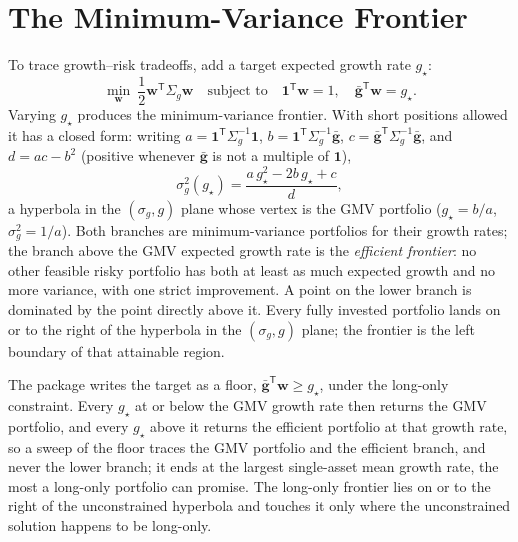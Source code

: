 \documentclass[11pt]{article}
\begin{document}
\section{The Minimum-Variance Frontier}

To trace growth--risk tradeoffs, add a target expected growth rate $g_\star$:
\begin{equation}
  \label{eq:frontier-problem}
  \min_{\mathbf w}\ \frac12\mathbf w^{\mathsf T}\Sigma_g\mathbf w
  \quad\text{subject to}\quad
  \mathbf1^{\mathsf T}\mathbf w=1,
  \quad
  \bar{\mathbf g}^{\mathsf T}\mathbf w=g_\star.
\end{equation}
Varying $g_\star$ produces the minimum-variance frontier. With short positions allowed it has a closed form: writing $a=\mathbf1^{\mathsf T}\Sigma_g^{-1}\mathbf1$, $b=\mathbf1^{\mathsf T}\Sigma_g^{-1}\bar{\mathbf g}$, $c=\bar{\mathbf g}^{\mathsf T}\Sigma_g^{-1}\bar{\mathbf g}$, and $d=ac-b^2$ (positive whenever $\bar{\mathbf g}$ is not a multiple of $\mathbf1$),
\begin{equation}
  \label{eq:frontier-hyperbola}
  \sigma_g^2(g_\star)=\frac{a\,g_\star^2-2b\,g_\star+c}{d},
\end{equation}
a hyperbola in the $(\sigma_g,g)$ plane whose vertex is the GMV portfolio ($g_\star=b/a$, $\sigma_g^2=1/a$). Both branches are minimum-variance portfolios for their growth rates; the branch above the GMV expected growth rate is the \emph{efficient frontier}: no other feasible risky portfolio has both at least as much expected growth and no more variance, with one strict improvement. A point on the lower branch is dominated by the point directly above it. Every fully invested portfolio lands on or to the right of the hyperbola in the $(\sigma_g,g)$ plane; the frontier is the left boundary of that attainable region.

The package writes the target as a floor, $\bar{\mathbf g}^{\mathsf T}\mathbf w\geq g_\star$, under the long-only constraint. Every $g_\star$ at or below the GMV growth rate then returns the GMV portfolio, and every $g_\star$ above it returns the efficient portfolio at that growth rate, so a sweep of the floor traces the GMV portfolio and the efficient branch, and never the lower branch; it ends at the largest single-asset mean growth rate, the most a long-only portfolio can promise. The long-only frontier lies on or to the right of the unconstrained hyperbola and touches it only where the unconstrained solution happens to be long-only.
\end{document}
